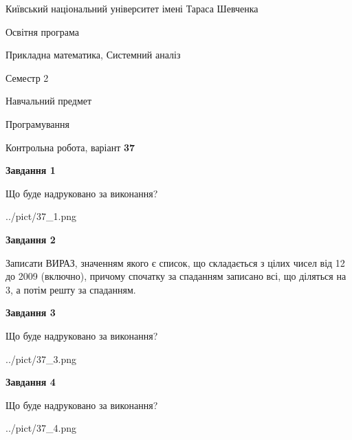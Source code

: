 \documentclass[12pt, ukrainian]{article}
\begin{document}
{{\begin {small}\par
{ \center  Київський національний університет імені Тараса Шевченка \par}
{\parbox {5 cm}{Освітня програма \hfill}{\parbox {8 cm}{Прикладна математика, Системний аналіз \hfill}}\parbox {5 cm}{\hfill Семестр 2}}\par
{\parbox {5 cm} {Навчальний предмет \hfill}\parbox {7 cm}{Програмування \hfill}\parbox {6cm}{\hfill}\par}\vspace{-7pt} \end{small}}{\center Контрольна робота, варіант  \No \textbf
{ 37 }\par}}
{
\begin {large}
{\begin {center}\textbf{Завдання 1}\end {center}}\par
Що буде надруковано за виконання?\par\par
\begin{center}
	{../pict/37_1.png}
\end{center}
\newpage

{\begin {center}\textbf{Завдання 2}\end {center}}\par

Записати ВИРАЗ, значенням якого є список, що складається з цілих чисел від 12 до 2009 (включно), причому спочатку за спаданням записано всі, що діляться на 3, а потім решту за спаданням.\par
\newpage

{\begin {center}\textbf{Завдання 3}\end {center}}\par
Що буде надруковано за виконання?
\begin{center}
	{../pict/37_3.png}
\end{center}
\newpage

{\begin {center}\textbf{Завдання 4}\end {center}}\par
Що буде надруковано за виконання?\par
\begin{center}
	{../pict/37_4.png}
\end{center}
\newpage


\end{large}}
\end{document}
